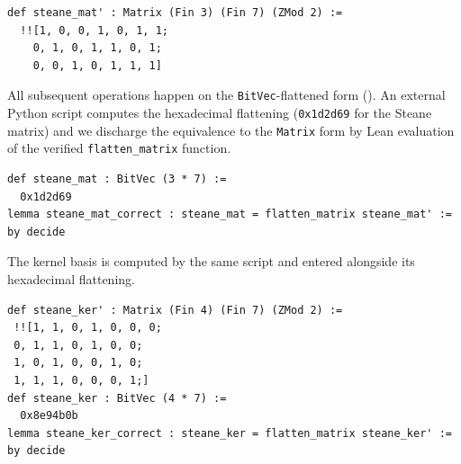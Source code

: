 \begin{lstlisting}
def steane_mat' : Matrix (Fin 3) (Fin 7) (ZMod 2) :=
  !![1, 0, 0, 1, 0, 1, 1;
    0, 1, 0, 1, 1, 0, 1;
    0, 0, 1, 0, 1, 1, 1]
\end{lstlisting}

%

All subsequent operations happen on the \lstinline{BitVec}-flattened form
(). An external Python script computes the hexadecimal
flattening (\texttt{0x1d2d69} for the Steane matrix) and we discharge the
equivalence to the \lstinline{Matrix} form by Lean evaluation of the verified
\lstinline{flatten_matrix} function.

\begin{lstlisting}
def steane_mat : BitVec (3 * 7) :=
  0x1d2d69
lemma steane_mat_correct : steane_mat = flatten_matrix steane_mat' := by decide
\end{lstlisting}

%

The kernel basis is computed by the same script and entered alongside its
hexadecimal flattening.

\begin{lstlisting}
def steane_ker' : Matrix (Fin 4) (Fin 7) (ZMod 2) :=
 !![1, 1, 0, 1, 0, 0, 0;
 0, 1, 1, 0, 1, 0, 0;
 1, 0, 1, 0, 0, 1, 0;
 1, 1, 1, 0, 0, 0, 1;]
def steane_ker : BitVec (4 * 7) :=
  0x8e94b0b
lemma steane_ker_correct : steane_ker = flatten_matrix steane_ker' := by decide
\end{lstlisting}

%
%

